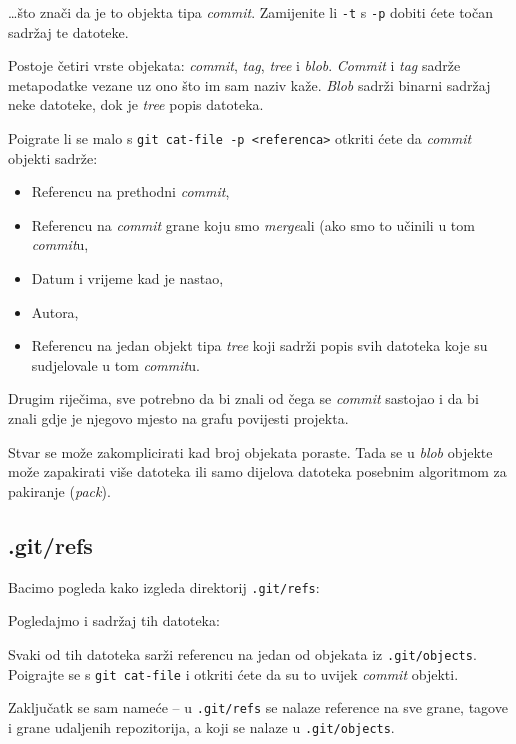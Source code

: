 

\dots{}što znači da je to objekta tipa \emph{commit}.
Zamijenite li \verb+-t+ s \verb+-p+ dobiti ćete točan sadržaj te datoteke.

Postoje četiri vrste objekata: \emph{commit}, \emph{tag}, \emph{tree} i \emph{blob}. 
\emph{Commit} i \emph{tag} sadrže metapodatke vezane uz ono što im sam naziv kaže.
\emph{Blob} sadrži binarni sadržaj neke datoteke, dok je \emph{tree} popis datoteka.

Poigrate li se malo s \verb+git cat-file -p <referenca>+ otkriti ćete da \emph{commit} objekti sadrže:

\begin{itemize}
	\item Referencu na prethodni \emph{commit},
	\item Referencu na \emph{commit} grane koju smo \emph{merge}ali (ako smo to učinili u tom \emph{commit}u,
	\item Datum i vrijeme kad je nastao,
	\item Autora,
	\item Referencu na jedan objekt tipa \emph{tree} koji sadrži popis svih datoteka koje su sudjelovale u tom \emph{commit}u.
\end{itemize}

Drugim riječima, sve potrebno da bi znali od čega se \emph{commit} sastojao i da bi znali gdje je njegovo mjesto na grafu povijesti projekta.

Stvar se može zakomplicirati kad broj objekata poraste.
Tada se u \emph{blob} objekte može zapakirati više datoteka ili samo dijelova datoteka posebnim algoritmom za pakiranje (\emph{pack}).

\subsection*{.git/refs}

Bacimo pogleda kako izgleda direktorij \verb+.git/refs+:



Pogledajmo i sadržaj tih datoteka:



Svaki od tih datoteka sarži referencu na jedan od objekata iz \verb+.git/objects+. 
Poigrajte se s \verb+git cat-file+ i otkriti ćete da su to uvijek \emph{commit} objekti.

Zaključatk se sam nameće -- u \verb+.git/refs+ se nalaze reference na sve grane, tagove i grane udaljenih repozitorija, a koji se nalaze u \verb+.git/objects+.

